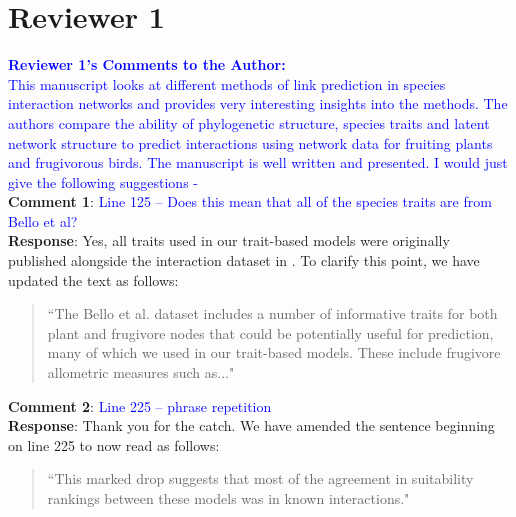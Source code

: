 \documentclass{article}
\begin{document}
\section{Reviewer 1}
\textcolor{blue}{\textbf{Reviewer 1's Comments to the Author:} \\
This manuscript looks at different methods of link prediction in species interaction networks and provides very interesting insights into the methods. The authors compare the ability of phylogenetic structure, species traits and latent network structure to predict interactions using network data for fruiting plants and frugivorous birds. The manuscript is well written and presented. I would just give the following suggestions -} \newline
\\
\textbf{Comment 1}: \textcolor{blue}{Line 125 – Does this mean that all of the species traits are from Bello et al?}
    \\
    \textbf{Response}: Yes, all traits used in our trait-based models were originally published alongside the interaction dataset in     \cite{bello2017}. To clarify this point, we have updated the text as follows: 
    \begin{quote}
        ``The Bello et al. dataset includes a number of informative traits for both plant and frugivore nodes that could be potentially useful for prediction, many of which we used in our trait-based models. These include frugivore allometric measures such as..."
    \end{quote}

\textbf{Comment 2}: \textcolor{blue}{Line 225 – phrase repetition}
\\
    \textbf{Response}: Thank you for the catch. We have amended the sentence beginning on line 225 to now read as follows:
    \begin{quote}
    ``This marked drop suggests that most of the agreement in suitability rankings between these models was in known interactions."
    \end{quote}
\\
\end{document}
